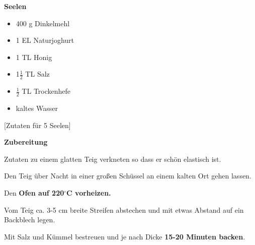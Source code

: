 

\parindent0pt	

\pagestyle{empty}


\textbf{{\LARGE Seelen}}%

\hrulefill
\vspace*{\fill}
\begin{multicols}{2}	


\begin{itemize}
\item 400 g Dinkelmehl
\item 1 EL Naturjoghurt
\item 1 TL Honig
\item 1$\frac{1}{2}$ TL Salz
\item $\frac{1}{2}$ TL Trockenhefe
\item kaltes Wasser
\end{itemize}
\end{multicols}
\vfill									%

\vspace{1cm}
%
\begin{center}
%
[Zutaten für 5 Seelen]%
\end{center}


\vfill
\newpage
\textbf{{\LARGE Zubereitung}}%

\hrulefill

\vspace*{\fill}
\begin{multicols}{2}

Zutaten zu einem glatten Teig verkneten so dass er schön elastisch ist.\newline

Den Teig über Nacht in einer großen Schüssel an einem kalten Ort gehen lassen.\newline

Den \textbf{Ofen auf 220$^\circ$C vorheizen.} \newline

Vom Teig ca. 3-5 cm breite Streifen abstechen und mit etwas Abstand auf ein Backblech legen.\newline

Mit Salz und Kümmel bestreuen und je nach Dicke \textbf{15-20 Minuten backen}.


\end{multicols}
\vfill
